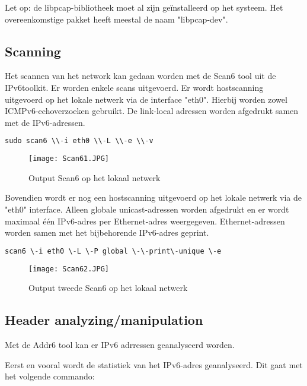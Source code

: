 Let op: de libpcap-bibliotheek moet al zijn geïnstalleerd op het systeem. Het overeenkomstige pakket heeft meestal de naam "libpcap-dev".

\subsection{Scanning }
Het scannen van het network kan gedaan worden met de Scan6 tool uit de IPv6toolkit. Er worden enkele scans uitgevoerd.
Er wordt hostscanning uitgevoerd op het lokale netwerk via de interface "eth0". Hierbij worden zowel ICMPv6-echoverzoeken gebruikt. De link-local adressen worden afgedrukt samen met de IPv6-adressen.

\begin{lstlisting}[language=PowerShell,style=PowerShellStyle]
    sudo scan6 \\-i eth0 \\-L \\-e \\-v
\end{lstlisting}
\begin{figure}[H]
    \texttt{[image: Scan61.JPG]}
    \caption{
       Output Scan6 op het lokaal netwerk }
       \label{fig:Scan61}
\end{figure}  

Bovendien wordt er nog een hostscanning uitgevoerd op het lokale netwerk via de "eth0" interface. Alleen globale unicast-adressen worden afgedrukt en er wordt maximaal één IPv6-adres per Ethernet-adres weergegeven. Ethernet-adressen worden samen met het bijbehorende IPv6-adres geprint.
\begin{lstlisting}[language=PowerShell,style=PowerShellStyle]
    scan6 \-i eth0 \-L \-P global \-\-print\-unique \-e
\end{lstlisting}
\begin{figure}[H]
    \texttt{[image: Scan62.JPG]}
    \caption{
        Output tweede Scan6 op het lokaal netwerk }
        \label{fig:Scan62}
\end{figure}  

\subsection{Header analyzing/manipulation }

Met de Addr6 tool kan er IPv6 adrressen  geanalyseerd worden. 


Eerst en vooral wordt de statistiek van het IPv6-adres geanalyseerd. Dit gaat met het volgende commando:

